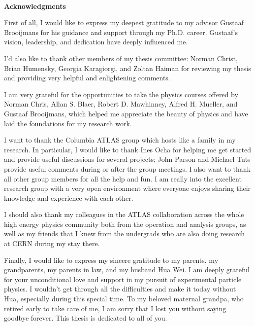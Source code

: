 ~\\[1in] %
\textbf{\Huge Acknowledgments}\\

\noindent 
\par First of all, I would like to express my deepest gratitude to my advisor Gustaaf Brooijmans for his guidance and support through my Ph.D. career. Gustaaf's vision, leadership, and dedication have deeply influenced me. 

\par I'd also like to thank other members of my thesis committee: Norman Christ, Brian Humensky, Georgia Karagiorgi, and Zoltan Haiman for reviewing my thesis and providing very helpful and enlightening comments.


\par I am very grateful for the opportunities to take the physics courses offered by Norman Chris, Allan S. Blaer, Robert D. Mawhinney, Alfred H. Mueller, and Gustaaf Brooijmans, which helped me appreciate the beauty of physics and have laid the foundations for my research work. 

\par I want to thank the Columbia ATLAS group which hosts like a family in my research. In particular, I would like to thank Ines Ocha for helping me get started and provide useful discussions for several projects; John Parson and Michael Tuts provide useful comments during or after the group meetings. I also want to thank all other group members for all the help and fun. I am really into the excellent research group with a very open environment where everyone enjoys sharing their knowledge and experience with each other. 
\par I should also thank my colleagues in the ATLAS collaboration across the whole high energy physics community both from the operation and analysis groups, as well as my friends that I knew from the undergrads who are also doing research at CERN during my stay there.
\par Finally, I would like to express my sincere gratitude to my parents,  my grandparents, my parents in law, and my husband Hua Wei. I am deeply grateful for your unconditional love and support in my pursuit of experimental particle physics. I wouldn't get through all the difficulties and make it today without Hua, especially during this special time. To my beloved maternal grandpa, who retired early to take care of me, I am sorry that I lost you without saying goodbye forever. This thesis is dedicated to all of you. 